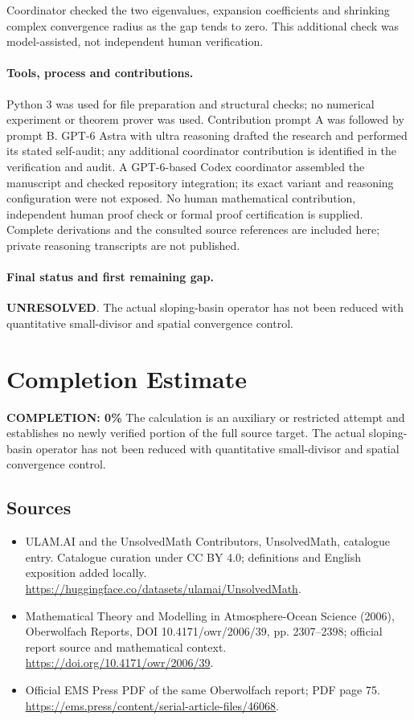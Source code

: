 \documentclass[11pt]{article}
\begin{document}
Coordinator checked the two eigenvalues, expansion coefficients and shrinking complex convergence radius as the gap tends to zero. This additional check was model-assisted, not independent human verification.

\paragraph{Tools, process and contributions.}
Python 3 was used for file preparation and structural checks; no numerical experiment or theorem prover was used. Contribution prompt A was followed by prompt B. GPT-6 Astra with ultra reasoning drafted the research and performed its stated self-audit; any additional coordinator contribution is identified in the verification and audit. A GPT-6-based Codex coordinator assembled the manuscript and checked repository integration; its exact variant and reasoning configuration were not exposed. No human mathematical contribution, independent human proof check or formal proof certification is supplied. Complete derivations and the consulted source references are included here; private reasoning transcripts are not published.

\paragraph{Final status and first remaining gap.}
\textbf{UNRESOLVED}. The actual sloping-basin operator has not been reduced with quantitative small-divisor and spatial convergence control.

\section{Completion Estimate}
\noindent\textbf{COMPLETION: 0\%}
The calculation is an auxiliary or restricted attempt and establishes no newly verified portion of the full source target. The actual sloping-basin operator has not been reduced with quantitative small-divisor and spatial convergence control.

\subsection{Sources}
\begin{itemize}
\item[\hypertarget{source:statement:1}{S1}] ULAM.AI and the UnsolvedMath Contributors, UnsolvedMath, catalogue entry. Catalogue curation under CC BY 4.0; definitions and English exposition added locally.
\url{https://huggingface.co/datasets/ulamai/UnsolvedMath}.
\item[\hypertarget{source:statement:2}{S2}] Mathematical Theory and Modelling in Atmosphere-Ocean Science (2006), Oberwolfach Reports, DOI 10.4171/owr/2006/39, pp. 2307--2398; official report source and mathematical context.
\url{https://doi.org/10.4171/owr/2006/39}.
\item[\hypertarget{source:statement:3}{S3}] Official EMS Press PDF of the same Oberwolfach report; PDF page 75.
\url{https://ems.press/content/serial-article-files/46068}.
\end{itemize}
\label{end:statement}
\end{document}
